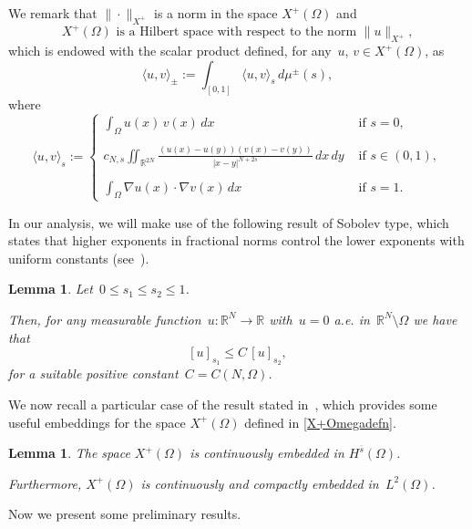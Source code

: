 \documentclass[12pt,a4paper,intlimits,sumlimits]{amsart}
\def \R {\mathbb{R}}
\theoremstyle{definition}
\theoremstyle{plain}
\newtheorem{lemma}[definition]{Lemma}
\numberwithin{equation}{section}
\renewcommand{\le}{\leqslant}
\begin{document}
We remark that $\|\cdot\|_{X^+}$ is a norm in the space $X^+(\Omega)$ and
\begin{equation}\label{X+Hilbert}
\mbox{$X^+(\Omega)$ is a Hilbert space with respect to the norm $\|u\|_{X^+}$},
\end{equation}
which is endowed with the scalar product defined, for any~$u$, $v\in X^+(\Omega)$, as
\begin{equation}\label{scalarepiu}
\langle u, v\rangle_\pm :=  \int_{[0,1]}\langle u, v\rangle_s\,d\mu^\pm(s),
\end{equation}
where
$$\langle u, v\rangle_s:=
\begin{cases}
\displaystyle\int_\Omega u(x)\,v(x)\,dx  &\mbox{ if } s=0,
\\ \\
c_{N,s}\displaystyle\iint_{\R^{2N}}\frac{(u(x)-u(y))(v(x)-v(y))}{|x-y|^{N+2s}}\,dx\,dy &\mbox{ if } s\in(0,1),
\\ \\
\displaystyle\int_\Omega \nabla u(x)\cdot\nabla v(x)\,dx  &\mbox{ if } s=1.
\end{cases}
$$

In our analysis, we will make use of the following result of Sobolev type, which states that higher exponents in fractional norms control the lower exponents with uniform constants (see~\cite[Lemma~2.1]{MR4736013}).
\begin{lemma}\label{nons} 
Let~$0\le s_1 \le s_2 \le1$. 

Then, for any measurable function~$u:\R^N\to\R$ with~$u=0$ a.e. in~$\R^N\setminus\Omega$ we have that
\begin{equation}\label{spp}
[u]_{s_1}\le C \, [u]_{s_2},
\end{equation}
for a suitable positive constant~$C=C(N,\Omega)$.
\end{lemma}

We now recall a particular case of the result stated in~\cite[Proposition~2.4]{MR4736013}, which provides some useful embeddings for the space $X^+(\Omega)$ defined in \eqref{X+Omegadefn}.

\begin{lemma}\label{embeddingsXOmega}
The space $X^+(\Omega)$ is continuously embedded in $H^{\overline s}(\Omega)$.

Furthermore, $X^+(\Omega)$ is continuously and compactly embedded in~$L^2(\Omega)$.
\end{lemma}


Now we present some preliminary results.
\end{document}
